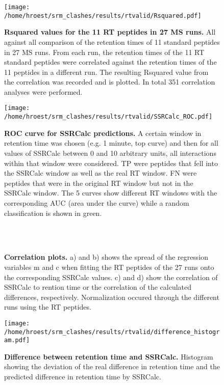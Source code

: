 \begin{figure}
\texttt{[image: /home/hroest/srm\_clashes/results/rtvalid/Rsquared.pdf]}
\caption{ \textbf{Rsquared values for the 11 RT peptides in 27 MS runs.}
All against all comparison of the retention times of 11 standard peptides in 27
MS runs. From each run, the retention times of the 11 RT standard peptides were
correlated against the retention times of the 11 peptides in a different run.
The resulting Rsquared value from the correlation was recorded and is plotted.
In total 351 correlation analyses were performed.  }
\label{fig:Rsquared}
\end{figure}

\begin{figure}
\texttt{[image: /home/hroest/srm\_clashes/results/rtvalid/SSRCalc\_ROC.pdf]}
\caption{ \textbf{ROC curve for SSRCalc predictions.}
A certain window in retention time was chosen (e.g. 1 minute, top curve) and
then for all values of SSRCalc between 0 and 10 arbitrary units, all
interactions within that window were considered.
TP were peptides that fell into the SSRCalc window as well as the real RT
window. FN were peptides that were in the original RT window but not in the
SSRCalc window.  The 5 curves show different RT windows with the corresponding
AUC (area under the curve) while a random classification is shown in green.}
\label{fig:SSRCalcROC}
\end{figure}


\begin{figure}

\center
{} 
  \\
 \\


\caption{ \textbf{Correlation plots.}
a) and b) shows the spread of the regression variables m and c when fitting the
RT peptides of the 27 runs onto the corresponding SSRCalc values. c) and d)
show the correlation of SSRCalc to rention time or the
correlation of the calculated differences, respectively. Normalization occured
through the different runs using the RT peptides. }
\label{fig:400ra.comp}
\end{figure}


\begin{figure}
\texttt{[image: /home/hroest/srm\_clashes/results/rtvalid/difference\_histogram.pdf]}
\caption{ \textbf{Difference between retention time and SSRCalc.}
Histogram showing the deviation of the real difference in retention time and
the predicted difference in retention time by SSRCalc. }
\label{fig:DiffHist}
\end{figure}


